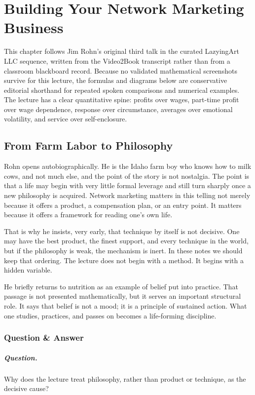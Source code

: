 \chapter{Building Your Network Marketing Business}

This chapter follows Jim Rohn's original third talk in the curated LazyingArt LLC sequence, written from the Video2Book transcript rather than from a classroom blackboard record. Because no validated mathematical screenshots survive for this lecture, the formulas and diagrams below are conservative editorial shorthand for repeated spoken comparisons and numerical examples. The lecture has a clear quantitative spine: profits over wages, part-time profit over wage dependence, response over circumstance, averages over emotional volatility, and service over self-enclosure.

\section{From Farm Labor to Philosophy}

Rohn opens autobiographically. He is the Idaho farm boy who knows how to milk cows, and not much else, and the point of the story is not nostalgia. The point is that a life may begin with very little formal leverage and still turn sharply once a new philosophy is acquired. Network marketing matters in this telling not merely because it offers a product, a compensation plan, or an entry point. It matters because it offers a framework for reading one's own life.

That is why he insists, very early, that technique by itself is not decisive. One may have the best product, the finest support, and every technique in the world, but if the philosophy is weak, the mechanism is inert. In these notes we should keep that ordering. The lecture does not begin with a method. It begins with a hidden variable.

He briefly returns to nutrition as an example of belief put into practice. That passage is not presented mathematically, but it serves an important structural role. It says that belief is not a mood; it is a principle of sustained action. What one studies, practices, and passes on becomes a life-forming discipline.

\subsection{Question \& Answer}

\paragraph{Question.} Why does the lecture treat philosophy, rather than product or technique, as the decisive cause?


